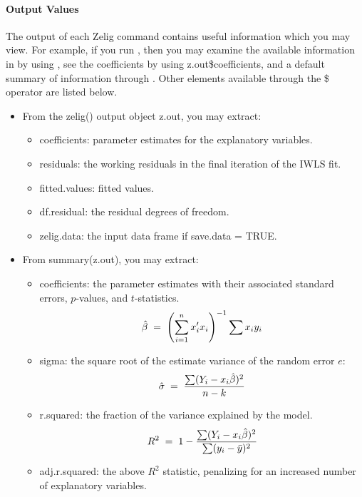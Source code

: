 \documentclass[letterpaper,10pt,english]{sphinxmanual}
\begin{document}
\paragraph{Output Values}
\label{zelig-ls:output-values}
The output of each Zelig command contains useful information which you
may view. For example, if you run
, then you may examine the
available information in  by using , see the
coefficients by using z.out\$coefficients, and a default summary of
information through . Other elements available through
the \$ operator are listed below.
\begin{itemize}
\item {} 
From the zelig() output object z.out, you may extract:
\begin{itemize}
\item {} 
coefficients: parameter estimates for the explanatory variables.

\item {} 
residuals: the working residuals in the final iteration of the
IWLS fit.

\item {} 
fitted.values: fitted values.

\item {} 
df.residual: the residual degrees of freedom.

\item {} 
zelig.data: the input data frame if save.data = TRUE.

\end{itemize}

\item {} 
From summary(z.out), you may extract:
\begin{itemize}
\item {} 
coefficients: the parameter estimates with their associated
standard errors, \(p\)-values, and \(t\)-statistics.
\begin{gather}
\begin{split}\hat{\beta} \; = \; \left(\sum_{i=1}^n x_i' x_i\right)^{-1} \sum x_i y_i\end{split}\notag
\end{gather}
\item {} 
sigma: the square root of the estimate variance of the random
error \(e\):
\begin{gather}
\begin{split}\hat{\sigma} \; = \; \frac{\sum (Y_i-x_i\hat{\beta})^2}{n-k}\end{split}\notag
\end{gather}
\item {} 
r.squared: the fraction of the variance explained by the model.
\begin{gather}
\begin{split}R^2 \; = \; 1 - \frac{\sum (Y_i-x_i\hat{\beta})^2}{\sum (y_i -
         \bar{y})^2}\end{split}\notag
\end{gather}
\item {} 
adj.r.squared: the above \(R^2\) statistic, penalizing for an
increased number of explanatory variables.


\end{itemize}
\end{itemize}
\end{document}
